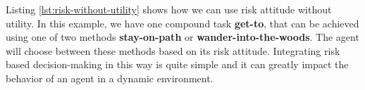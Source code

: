 Listing \ref{lst:risk-without-utility} shows how we can use risk attitude without utility. In this example, we have one compound task \textbf{get-to}, that can be achieved using one of two methods \textbf{stay-on-path} or \textbf{wander-into-the-woods}. The agent will choose between these methods based on its risk attitude. Integrating risk based decision-making in this way is quite simple and it can greatly impact the behavior of an agent in a dynamic environment.